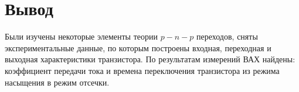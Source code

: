 \section{Вывод}
Были изучены некоторые элементы теории $p-n-p$ переходов, сняты экспериментальные данные, по которым построены входная, переходная и выходная характеристики
транзистора. По результатам измерений ВАХ найдены: коэффициент передачи тока и времена переключения транзистора из режима насыщения в режим отсечки.

